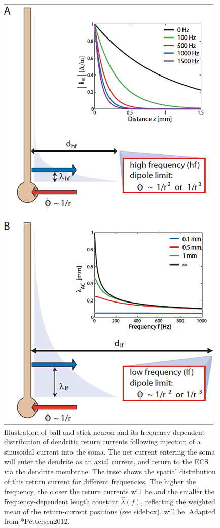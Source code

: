 \begin{figure}[!ht]
\begin{center}
\includegraphics{Figures/Spikes/Spikes-ball-and-stick-sketch-w70-r150}
\end{center}
\caption[]{Illustration of ball-and-stick neuron and its frequency-dependent 
distribution of dendritic return currents following injection of a sinusoidal current into the soma.
The net current entering the soma will enter the dendrite as an axial current, and return to the 
ECS via the dendrite membrane. The inset shows the spatial distribution of this return current
for different frequencies. The higher the frequency, the closer the return currents will be and
the smaller the frequency-dependent length constant $\hat{\lambda}(f)$, reflecting the weighted mean 
of the return-current positions (see sidebox), will be. 
 Adapted from \citeasnoun**{Pettersen2012}.
}
\label{fig:Spikes:ball-and-stick-sketch}
\end{figure}
%


